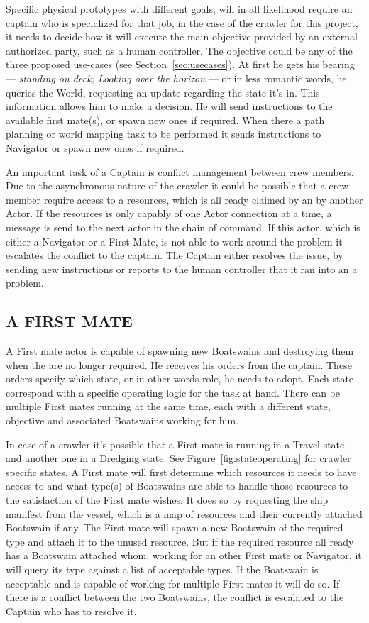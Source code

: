 Specific physical prototypes with different goals, will in all likelihood require an captain who is specialized for that
job, in the case of the crawler for this project, it needs to decide how it will execute the main objective provided by
an external authorized party, such as a human controller. The objective could be any of the three proposed use-cases
(see Section~\ref{sec:usecases}). At first he gets his bearing --- \textit{standing on deck; Looking over the horizon}
--- or in less romantic words, he queries the World, requesting an update regarding the state it's in. This information
allows him to make a decision. He will send instructions to the available first mate(s), or spawn new ones if required.
When there a path planning or world mapping task to be performed it sends instructions to Navigator or spawn new ones
if required.

An important task of a Captain is conflict management between crew members. Due to the asynchronous nature of the
crawler it could be possible that a crew member require access to a resources, which is all ready claimed by an by
another Actor. If the resources is only capably of one Actor connection at a time, a message is send to the next actor
in the chain of command. If this actor, which is either a Navigator or a First Mate, is not able to work around the
problem it escalates the conflict to the captain. The Captain either resolves the issue, by sending new instructions or
reports to the human controller that it ran into an a problem.

\subsection{A FIRST MATE}\label{seq:first mate}

A First mate actor is capable of spawning new Boatswains and destroying them when the are no longer required. He
receives his orders from the captain. These orders specify which state, or in other words role, he needs to adopt. Each
state correspond with a specific operating logic for the task at hand. There can be multiple First mates running at the
same time, each with a different state, objective and associated Boatswains working for him.

In case of a crawler it's possible that a First mate is running in a Travel state, and another one in a Dredging state.
See Figure~\ref{fig:stateoperating} for crawler specific states. A First mate will first determine which resources it
needs to have access to and what type(s) of Boatswains are able to handle those resources to the satisfaction of the
First mate wishes. It does so by requesting the ship manifest from the vessel, which is a map of resources and their
currently attached Boatswain if any. The First mate will spawn a new Boatswain of the required type and attach it to the
unused resource. But if the required resource all ready has a Boatswain attached whom, working for an other First mate
or Navigator, it will query its type against a list of acceptable types. If the Boatswain is acceptable and is capable
of working for multiple First mates it will do so. If there is a conflict between the two Boatswains, the conflict is
escalated to the Captain who has to resolve it.

